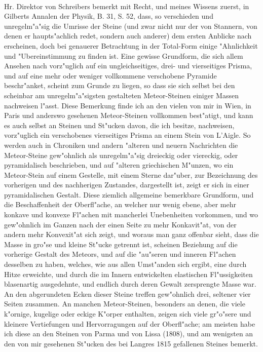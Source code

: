 \documentclass[a4paper, 11pt, oneside, polutonikogreek, german]{article}
\begin{document}
\paragraph{}
Hr. Direktor von Schreibers bemerkt mit Recht, und meines Wissens zuerst, in Gilberts Annalen der Physik, B. 31, S. 52, dass, so verschieden und unregelm"a"sig die Umrisse der Steine (und zwar nicht nur der von Stannern, von denen er haupts"achlich redet, sondern auch anderer) dem ersten Anblicke nach erscheinen, doch bei genauerer Betrachtung in der Total-Form einige "Ahnlichkeit und "Ubereinstimmung zu finden ist. Eine gewisse Grundform, die sich allem Ansehen nach vorz"uglich auf ein ungleichseitiges, drei- und vierseitiges Prisma, und auf eine mehr oder weniger vollkommene verschobene Pyramide beschr"anket, scheint zum Grunde zu liegen, so dass sie sich selbst bei den scheinbar am unregelm"a"sigsten gestalteten Meteor-Steinen einiger Massen nachweisen l"asst. Diese Bemerkung finde ich an den vielen von mir in Wien, in Paris und anderswo gesehenen Meteor-Steinen vollkommen best"atigt, und kann es auch selbst an Steinen und St"ucken davon, die ich besitze, nachweisen, vorz"uglich ein verschobenes vierseitiges Prisma an einem Stein von L'Aigle. So werden auch in Chroniken und andern "alteren und neuern Nachrichten die Meteor-Steine gew"ohnlich als unregelm"a"sig dreieckig oder viereckig, oder pyramidalisch beschrieben, und auf "alteren griechischen M"unzen, wo ein Meteor-Stein auf einem Gestelle, mit einem Sterne dar"uber, zur Bezeichnung des vorherigen und des nachherigen Zustandes, dargestellt ist, zeigt er sich in einer pyramidalischen Gestalt. Diese ziemlich allgemeine bemerkbare Grundform, und die Beschaffenheit der Oberfl"ache, an welcher nur wenig ebene, aber mehr konkave und konvexe Fl"achen mit mancherlei Unebenheiten vorkommen, und wo gew"ohnlich im Ganzen nach der einen Seite zu mehr Konkavit"at, von der andern mehr Konvexit"at sich zeigt, und woraus man ganz offenbar sieht, dass die Masse in gro"se und kleine St"ucke getrennt ist, scheinen Beziehung auf die vorherige Gestalt des Meteors, und auf die "au"seren und inneren Fl"achen desselben zu haben, welches, wie aus allen Umst"anden sich ergibt, eine durch Hitze erweichte, und durch die im Innern entwickelten elastischen Fl"ussigkeiten blasenartig ausgedehnte, und endlich durch deren Gewalt zersprengte Masse war. An den abgerundeten Ecken dieser Steine treffen gew"ohnlich drei, seltener vier Seiten zusammen. An manchen Meteor-Steinen, besonders an denen, die viele k"ornige, kugelige oder eckige K"orper enthalten, zeigen sich viele gr"o"sere und kleinere Vertiefungen und Hervorragungen auf der Oberfl"ache; am meisten habe ich diese an den Steinen von Parma und von Lissa (1808), und am wenigsten an den von mir gesehenen St"ucken des bei Langres 1815 gefallenen Steines bemerkt.
\end{document}

